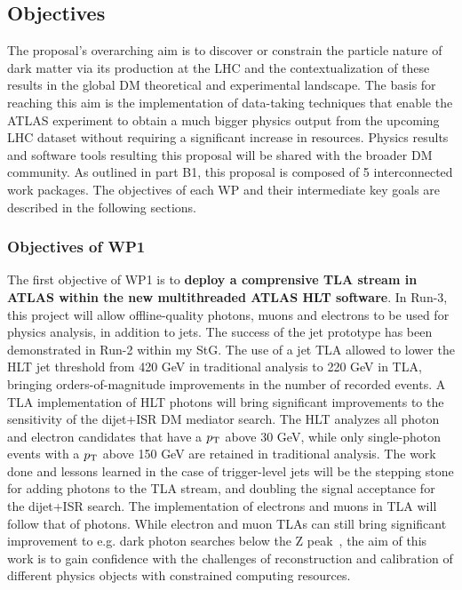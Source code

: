 \subsection{Objectives}
\label{sub:objectives}
\smallskip

The proposal’s overarching aim is to discover or constrain the particle nature of dark matter via its production at the LHC and the contextualization of these results in the global DM theoretical and experimental landscape. 
The basis for reaching this aim is the implementation of data-taking techniques that enable the ATLAS experiment to obtain a much bigger physics output from the upcoming LHC dataset without requiring a significant increase in resources. 
Physics results and software tools resulting this proposal will be shared with the broader DM community. 
As outlined in part B1, this proposal is composed of 5 interconnected work packages. 
The objectives of each WP and their intermediate key goals are described in the following sections. 


\subsubsection{Objectives of WP1}

The first objective of WP1 is to \textbf{deploy a comprensive TLA stream in ATLAS within the new multithreaded ATLAS HLT software}. %
In Run-3, this project will allow offline-quality photons, muons and electrons to be used for physics analysis, in addition to jets. 
The success of the jet prototype has been demonstrated in Run-2 within my StG. 
The use of a jet TLA allowed to lower the HLT jet threshold from 420 GeV in traditional analysis to 220 GeV in TLA, bringing orders-of-magnitude improvements in the number of recorded events. 
A TLA implementation of HLT photons will bring significant improvements to the sensitivity of the dijet+ISR DM mediator search. 
The HLT analyzes all photon and electron candidates that have a $p_{\rm{T}}$ above 30 GeV, 
while only single-photon events with a $p_{\rm{T}}$ above 150 GeV are retained in traditional analysis. 
The work done and lessons learned in the case of trigger-level jets will be the stepping stone for adding photons to the TLA stream, 
and doubling the signal acceptance for the dijet+ISR search. 
The implementation of electrons and muons in TLA will follow that of photons.
While electron and muon TLAs can still bring significant improvement to e.g. dark photon searches below the Z peak~\cite{ToBeCited}, %
the aim of this work is to gain confidence with the challenges of reconstruction and calibration of different physics objects with constrained computing resources. 


